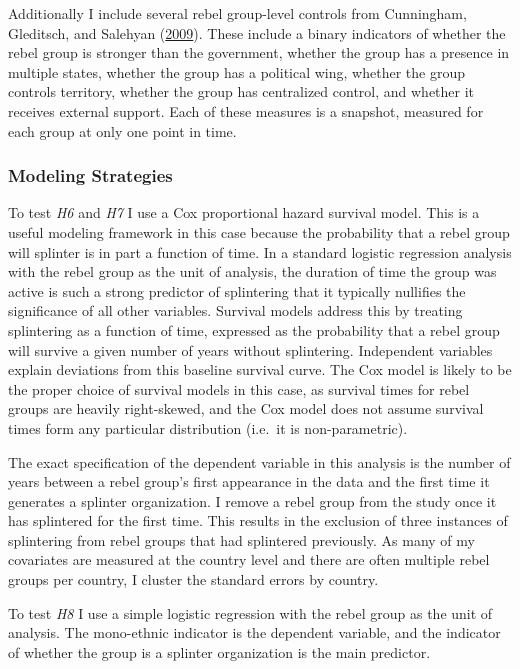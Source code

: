 \documentclass[12pt,]{book}
\theoremstyle{definition}
\theoremstyle{definition}
\theoremstyle{definition}
\theoremstyle{remark}
\begin{document}
Additionally I include several rebel group-level controls from
Cunningham, Gleditsch, and Salehyan
(\protect\hyperlink{ref-Cunningham2009}{2009}). These include a binary
indicators of whether the rebel group is stronger than the government,
whether the group has a presence in multiple states, whether the group
has a political wing, whether the group controls territory, whether the
group has centralized control, and whether it receives external support.
Each of these measures is a snapshot, measured for each group at only
one point in time.

\hypertarget{modeling-strategies}{%
\subsubsection*{Modeling Strategies}\label{modeling-strategies}}

To test \emph{H6} and \emph{H7} I use a Cox proportional hazard survival
model. This is a useful modeling framework in this case because the
probability that a rebel group will splinter is in part a function of
time. In a standard logistic regression analysis with the rebel group as
the unit of analysis, the duration of time the group was active is such
a strong predictor of splintering that it typically nullifies the
significance of all other variables. Survival models address this by
treating splintering as a function of time, expressed as the probability
that a rebel group will survive a given number of years without
splintering. Independent variables explain deviations from this baseline
survival curve. The Cox model is likely to be the proper choice of
survival models in this case, as survival times for rebel groups are
heavily right-skewed, and the Cox model does not assume survival times
form any particular distribution (i.e.~it is non-parametric).

The exact specification of the dependent variable in this analysis is
the number of years between a rebel group's first appearance in the data
and the first time it generates a splinter organization. I remove a
rebel group from the study once it has splintered for the first time.
This results in the exclusion of three instances of splintering from
rebel groups that had splintered previously. As many of my covariates
are measured at the country level and there are often multiple rebel
groups per country, I cluster the standard errors by country.

To test \emph{H8} I use a simple logistic regression with the rebel
group as the unit of analysis. The mono-ethnic indicator is the
dependent variable, and the indicator of whether the group is a splinter
organization is the main predictor.
\end{document}
